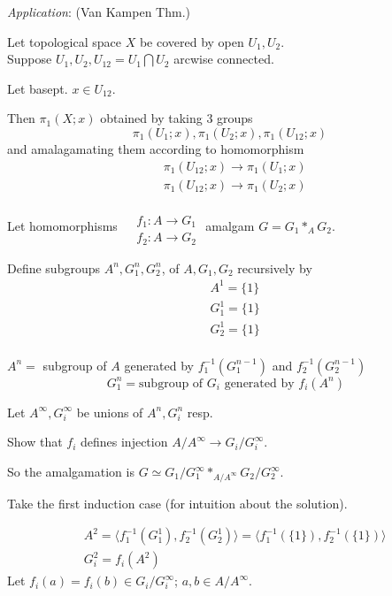 \documentclass[10pt]{amsart}
\newcommand{\exercisehead}[1]
  { \smallskip
   \noindent{\small\bf Exercise #1.}
  }
\begin{document}
\begin{multicols*}{2}
\emph{Application}: (Van Kampen Thm.)

Let topological space $X$ be covered by open $U_1,U_2$.   \\
Suppose $U_1,U_2, U_{12}=U_1\bigcap U_2$ arcwise connected.  

Let basept. $x\in U_{12}$.  

Then $\pi_1(X;x)$ obtained by taking 3 groups 
\[
\pi_1(U_1;x), \pi_1(U_2;x), \pi_1(U_{12};x)
\]
and amalagamating them according to homomorphism
\[
\begin{aligned}
& \pi_1(U_{12};x) \to \pi_1(U_1;x)  \\
& \pi_1(U_{12};x) \to \pi_1(U_2;x)
\end{aligned}
\]

\exercisehead{1}  
Let homomorphisms $\begin{aligned} & \quad \\
	& f_1 : A \to G_1 \\ 
	& f_2: A \to G_2 \end{aligned}
$
amalgam $G=G_1 *_A G_2$.  

Define subgroups $A^n,G_1^n, G_2^n$, of $A,G_1,G_2$ recursively by 
\[
\begin{aligned}
& A^1 = \lbrace 1 \rbrace \\
& G_1^1 = \lbrace 1 \rbrace \\ 
& G_2^1 = \lbrace 1 \rbrace \\ 
\end{aligned}
\]

$A^n = $ subgroup of $A$ generated by $f_1^{-1}(G_1^{n-1})$ and $f_2^{-1}(G_2^{n-1})$  
\[
G_1^n = \text{subgroup of $G_i$ generated by $f_i(A^n)$ }
\]

Let $A^{\infty}, G_i^{\infty}$ be unions of $A^n, G_i^n$ resp.  

Show that $f_i$ defines injection $A/A^{\infty} \to G_i/G_i^{\infty}$.  

So the amalgamation is $G \simeq G_1/G_1^{\infty} *_{A/A^{\infty}} G_2/G_2^{\infty}$.  

Take the first induction case (for intuition about the solution).  

\[
\begin{aligned}
	& A^2 = \langle f_1^{-1}( G_1^1), f_2^{-1}(G_2^1) \rangle = \langle f_1^{-1}(\lbrace 1 \rbrace), f_2^{-1}(\lbrace 1 \rbrace ) \rangle \\
	& G_i^2 = f_i(A^2)
\end{aligned}
\]
Let $f_i(a) = f_i(b) \in G_i/G_i^{\infty}$; $a,b\in A/A^{\infty}$.  


\end{multicols*}
\end{document}
